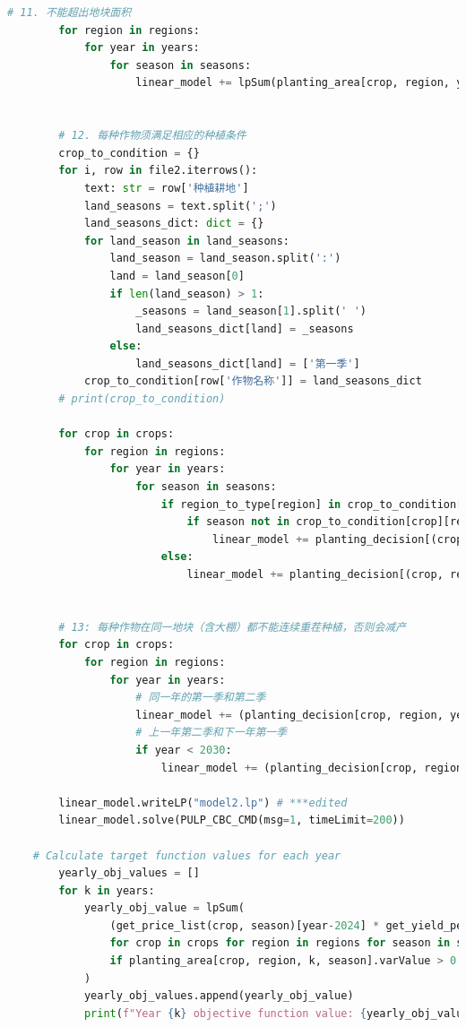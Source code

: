 \documentclass{cumcmthesis}
\begin{document}
\begin{appendices}
\begin{lstlisting}[language=python]
        # 11. 不能超出地块面积
        for region in regions:
            for year in years:
                for season in seasons:
                    linear_model += lpSum(planting_area[crop, region, year, season] for crop in crops) <= region_areas[region]
    
    
        # 12. 每种作物须满足相应的种植条件
        crop_to_condition = {}
        for i, row in file2.iterrows():
            text: str = row['种植耕地']
            land_seasons = text.split(';')
            land_seasons_dict: dict = {}
            for land_season in land_seasons:
                land_season = land_season.split(':')
                land = land_season[0]
                if len(land_season) > 1:
                    _seasons = land_season[1].split(' ')
                    land_seasons_dict[land] = _seasons
                else:
                    land_seasons_dict[land] = ['第一季']
            crop_to_condition[row['作物名称']] = land_seasons_dict
        # print(crop_to_condition)
    
        for crop in crops:
            for region in regions:
                for year in years:
                    for season in seasons:
                        if region_to_type[region] in crop_to_condition[crop]:
                            if season not in crop_to_condition[crop][region_to_type[region]]:
                                linear_model += planting_decision[(crop, region, year, season)] == 0
                        else:
                            linear_model += planting_decision[(crop, region, year, season)] == 0
                            
        
        # 13: 每种作物在同一地块（含大棚）都不能连续重茬种植，否则会减产
        for crop in crops:
            for region in regions:
                for year in years:
                    # 同一年的第一季和第二季
                    linear_model += (planting_decision[crop, region, year, '第一季'] + planting_decision[crop, region, year, '第二季'] <= 1)
                    # 上一年第二季和下一年第一季
                    if year < 2030:
                        linear_model += (planting_decision[crop, region, year, '第二季'] + planting_decision[crop, region, year+1, '第一季'] <= 1)
    
        linear_model.writeLP("model2.lp") # ***edited
        linear_model.solve(PULP_CBC_CMD(msg=1, timeLimit=200))
    
    # Calculate target function values for each year
        yearly_obj_values = []
        for k in years:
            yearly_obj_value = lpSum(
                (get_price_list(crop, season)[year-2024] * get_yield_per_acre_list(crop, region)[year-2024] - get_cost_list(crop, region)[year-2024]) * planting_area[crop, region, k, season].varValue
                for crop in crops for region in regions for season in seasons
                if planting_area[crop, region, k, season].varValue > 0  # Only consider variables with planting area greater than 0
            )
            yearly_obj_values.append(yearly_obj_value)
            print(f"Year {k} objective function value: {yearly_obj_value}")
    

\end{lstlisting}
\end{appendices}
\end{document}
